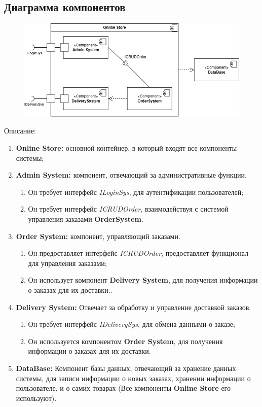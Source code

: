\documentclass[a4paper]{report}
\begin{document}
\subsection{Диаграмма компонентов}
\begin{figure}[H]
    \centering
    \includegraphics[width=\textwidth]{Диаграмма компонентов.png}
\end{figure}
Описание:
\begin{enumerate}
    \item \textbf{Online Store:} основной контейнер, в который входят все компоненты системы;
    \item \textbf{Admin System:} компонент, отвечающий за административные функции. \begin{enumerate}
        \item  Он требует интерфейс \textit{ILoginSys}, для аутентификации пользователей;
        \item Он требует интерфейс \textit{ICRUDOrder}, взаимодействуя с системой управления заказами \textbf{OrderSystem}.
    \end{enumerate}
    \item \textbf{Order System:} компонент, управляющий заказами. \begin{enumerate}
        \item Он предоставляет интерфейс \textit{ICRUDOrder}, предоставляет функционал для управления заказами;
        \item Он использует компонент \textbf{Delivery System}, для получения информации о заказах для их доставки..
    \end{enumerate}
    \item \textbf{Delivery System:} Отвечает за обработку и управление доставкой заказов. \begin{enumerate}
        \item Он требует интерфейс \textit{IDeliverySys}, для обмена данными о заказе;
        \item Он используется компонентом \textbf{Order System}, для получения информации о заказах для их доставки.
    \end{enumerate}
    \item \textbf{DataBase:} Компонент базы данных, отвечающий за хранение данных системы, для записи информации о новых заказах, хранении информации о пользователе, и о самих товарах (Все компоненты \textbf{Online Store} его используют).
\end{enumerate}
\end{document}
